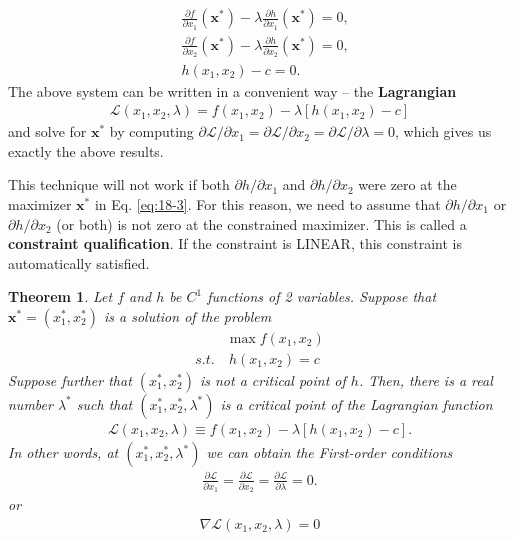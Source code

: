 \documentclass[10pt,a4paper]{book}
\newtheorem{theorem}{Theorem}[section]
\theoremstyle{definition}\newtheorem{definition}{Definition}
\theoremstyle{definition}\newtheorem{fact}{Fact}
\theoremstyle{definition}\newtheorem{ex}{Ex.}
\theoremstyle{definition}\newtheorem{project}{Project}
\theoremstyle{definition}\newtheorem{problem}{Problem}
\theoremstyle{definition}\newtheorem{example}{Example}
\numberwithin{theorem}{chapter}
\numberwithin{corollary}{chapter}
\numberwithin{assumption}{chapter}
\numberwithin{definition}{chapter}
\numberwithin{prop}{chapter}
\numberwithin{notation}{chapter}
\numberwithin{problem}{chapter}
\numberwithin{example}{chapter}
\numberwithin{fact}{chapter}
\numberwithin{ex}{chapter}
\newenvironment{ftheorem}
{\begin{mdframed}\begin{theorem}}
		{\end{theorem}\end{mdframed}}
\def\x{\mathbf x}
\begin{document}
	\begin{align*}
		& \frac{\partial f}{\partial x_1} (\x^*) - \lambda \frac{\partial h}{\partial x_1} (\x^*) = 0, \\
		& \frac{\partial f}{\partial x_2} (\x^*) - \lambda \frac{\partial h}{\partial x_2} (\x^*) = 0, \\
		& h(x_1, x_2) - c = 0.                                                                         
	\end{align*}
	The above system can be written in a convenient way -- the \textbf{Lagrangian}
	\begin{align*}
		\mathcal{L} (x_1, x_2, \lambda) = f(x_1, x_2) - \lambda \left[ h(x_1, x_2) - c \right] 
	\end{align*}
	and solve for $\x^*$ by computing $\partial \mathcal{L}/\partial x_1 = \partial \mathcal{L}/\partial x_2 = \partial \mathcal{L}/\partial \lambda = 0$, which gives us exactly the above results.
	
	This technique will not work if both $\partial h/\partial x_1$ and $\partial h/\partial x_2$ were zero at the maximizer $\x^*$ in Eq. \eqref{eq:18-3}. For this reason, we need to assume that $\partial h/\partial x_1$ or $\partial h/\partial x_2$ (or both) is not zero at the constrained maximizer. This is called a \textbf{constraint qualification}. If the constraint is LINEAR, this constraint is automatically satisfied.
	
	\begin{ftheorem}
		Let $f$ and $h$ be $C^1$ functions of 2 variables. Suppose that $\x^* = (x^*_1, x^*_2)$ is a solution of the problem
		\begin{align*}
			& \max f(x_1,x_2)   \\
			s.t. & \ h(x_1, x_2) = c 
		\end{align*}
		Suppose further that $(x^*_1, x^*_2)$ is not a critical point of $h$. Then, there is a real number $\lambda^*$ such that $(x^*_1, x^*_2, \lambda^*)$ is a critical point of the Lagrangian function
		\begin{align*}
			\mathcal{L} (x_1, x_2, \lambda) \equiv f(x_1, x_2) - \lambda [ h(x_1, x_2) - c]. 
		\end{align*}
		In other words, at $(x^*_1, x^*_2, \lambda^*)$ we can obtain the First-order conditions 
		\begin{align*}
			\frac{\partial \mathcal{L}}{\partial x_1} = 
			\frac{\partial \mathcal{L}}{\partial x_2} = 
			\frac{\partial \mathcal{L}}{\partial \lambda} = 0.
		\end{align*}
		or
		\begin{align*}
			\nabla \mathcal{L} (x_1, x_2, \lambda) = 0
		\end{align*}
	\end{ftheorem}
	
\end{document}
